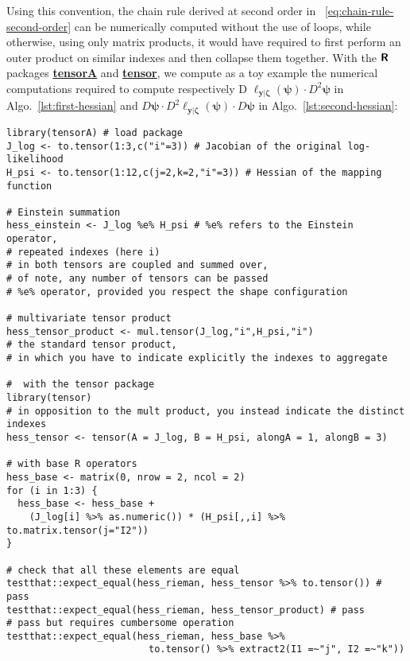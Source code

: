 \documentclass[long, final]{jobim}
\newcommand{\CRANpkg}[1]{\href{https://CRAN.R-project.org/package=#1}{\textbf{#1}}}
\begin{document}
Using this convention, the chain rule derived at second order in \equationname~\ref{eq:chain-rule-second-order} can be numerically computed without the use of loops, while otherwise, using only matrix products, it would have required to first perform an outer product on similar indexes and then collapse them together. With the $\textbf{\textsf{R}}$ packages \CRANpkg{tensorA} and \CRANpkg{tensor}, we compute as a toy example the numerical computations required to compute respectively D $\ell_{\boldsymbol{y}|\boldsymbol{\zeta}} (\boldsymbol{\psi}) \cdot D^2 \boldsymbol{\psi}$ in Algo.~\ref{lst:first-hessian} and $D \boldsymbol{\psi} \cdot  D^2 \ell_{\boldsymbol{y}|\boldsymbol{\zeta}} (\boldsymbol{\psi})  \cdot D\boldsymbol{\psi}$ in Algo.~\ref{lst:second-hessian}:

\clearpage

\begin{lstlisting}[caption={Computation of the First part of the Hessian},label={lst:first-hessian}]
library(tensorA) # load package
J_log <- to.tensor(1:3,c("i"=3)) # Jacobian of the original log-likelihood
H_psi <- to.tensor(1:12,c(j=2,k=2,"i"=3)) # Hessian of the mapping function

# Einstein summation
hess_einstein <- J_log %e% H_psi # %e% refers to the Einstein operator,
# repeated indexes (here i)
# in both tensors are coupled and summed over, 
# of note, any number of tensors can be passed
# %e% operator, provided you respect the shape configuration

# multivariate tensor product
hess_tensor_product <- mul.tensor(J_log,"i",H_psi,"i") 
# the standard tensor product,
# in which you have to indicate explicitly the indexes to aggregate

#  with the tensor package
library(tensor)
# in opposition to the mult product, you instead indicate the distinct indexes
hess_tensor <- tensor(A = J_log, B = H_psi, alongA = 1, alongB = 3) 

# with base R operators
hess_base <- matrix(0, nrow = 2, ncol = 2)
for (i in 1:3) {
  hess_base <- hess_base + 
    (J_log[i] %>% as.numeric()) * (H_psi[,,i] %>% to.matrix.tensor(j="I2")) 
}

# check that all these elements are equal
testthat::expect_equal(hess_rieman, hess_tensor %>% to.tensor()) # pass
testthat::expect_equal(hess_rieman, hess_tensor_product) # pass
# pass but requires cumbersome operation
testthat::expect_equal(hess_rieman, hess_base %>%
                         to.tensor() %>% extract2(I1 =~"j", I2 =~"k")) 
\end{lstlisting}
\end{document}
